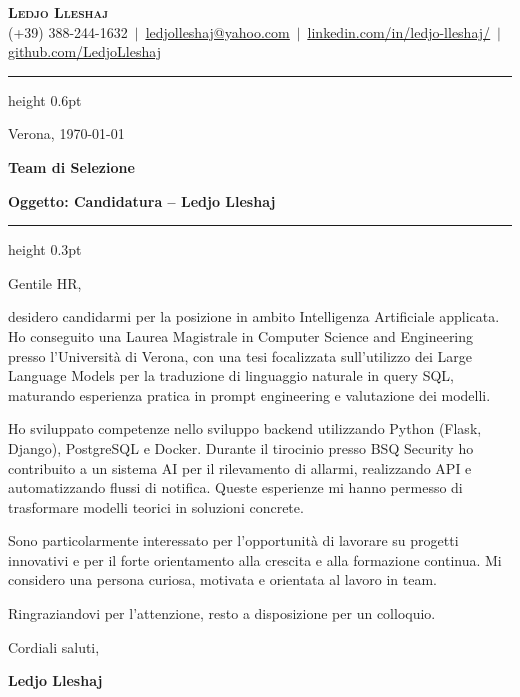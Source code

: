 \documentclass[a4paper,11pt]{article}
\begin{document}
\begin{center}
    {\Huge\bfseries\scshape Ledjo Lleshaj}\\[5pt]
    \small
    (+39) 388-244-1632
    $\,|\,$
    \href{mailto:ledjolleshaj@yahoo.com}{\underline{ledjolleshaj@yahoo.com}}
    $\,|\,$
    \href{https://linkedin.com/in/ledjo-lleshaj/}{\underline{linkedin.com/in/ledjo-lleshaj/}}
    $\,|\,$
    \href{https://github.com/LedjoLleshaj}{\underline{github.com/LedjoLleshaj}}
\end{center}

\vspace{2pt}
{\color{black}\hrule height 0.6pt}
\vspace{16pt}

\begin{flushright}
    Verona, \today
\end{flushright}

\vspace{6pt}

\textbf{Team di Selezione}\\


\vspace{10pt}

\textbf{Oggetto: Candidatura -- Ledjo Lleshaj}

\vspace{6pt}
{\color{black}\hrule height 0.3pt}
\vspace{12pt}

Gentile HR,

desidero candidarmi per la posizione in ambito Intelligenza Artificiale applicata. Ho conseguito una Laurea Magistrale in Computer Science and Engineering presso l'Università di Verona, con una tesi focalizzata sull'utilizzo dei Large Language Models per la traduzione di linguaggio naturale in query SQL, maturando esperienza pratica in prompt engineering e valutazione dei modelli.

Ho sviluppato competenze nello sviluppo backend utilizzando Python (Flask, Django), PostgreSQL e Docker. Durante il tirocinio presso BSQ Security ho contribuito a un sistema AI per il rilevamento di allarmi, realizzando API e automatizzando flussi di notifica. Queste esperienze mi hanno permesso di trasformare modelli teorici in soluzioni concrete.

Sono particolarmente interessato per l'opportunità di lavorare su progetti innovativi e per il forte orientamento alla crescita e alla formazione continua. Mi considero una persona curiosa, motivata e orientata al lavoro in team.

Ringraziandovi per l'attenzione, resto a disposizione per un colloquio.

\vspace{20pt}

Cordiali saluti,

\vspace{30pt}

\textbf{Ledjo Lleshaj}
\end{document}

